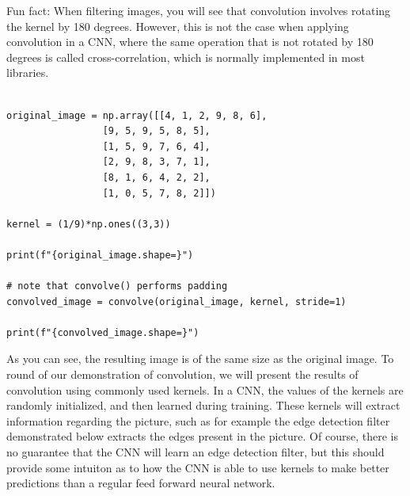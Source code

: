 \documentclass[%
oneside,                 %
final,                   %
10pt]{article}
\begin{document}
Fun fact: When filtering images, you will see that convolution
involves rotating the kernel by 180 degrees.  However, this is not the
case when applying convolution in a CNN, where the same operation that is not
rotated by 180 degrees is called cross-correlation, which is normally implemented in most libraries.


















\begin{verbatim}

original_image = np.array([[4, 1, 2, 9, 8, 6],
                 [9, 5, 9, 5, 8, 5],
                 [1, 5, 9, 7, 6, 4],
                 [2, 9, 8, 3, 7, 1],
                 [8, 1, 6, 4, 2, 2],
                 [1, 0, 5, 7, 8, 2]])

kernel = (1/9)*np.ones((3,3))

print(f"{original_image.shape=}")

# note that convolve() performs padding
convolved_image = convolve(original_image, kernel, stride=1)

print(f"{convolved_image.shape=}")

\end{verbatim}


As you can see, the resulting image is of the same size as the
original image. To round of our demonstration of convolution, we will
present the results of convolution using commonly used kernels. In a
CNN, the values of the kernels are randomly initialized, and then
learned during training. These kernels will extract information
regarding the picture, such as for example the edge detection filter
demonstrated below extracts the edges present in the picture. Of
course, there is no guarantee that the CNN will learn an edge
detection filter, but this should provide some intuiton as to how the
CNN is able to use kernels to make better predictions than a regular
feed forward neural network.
\end{document}

